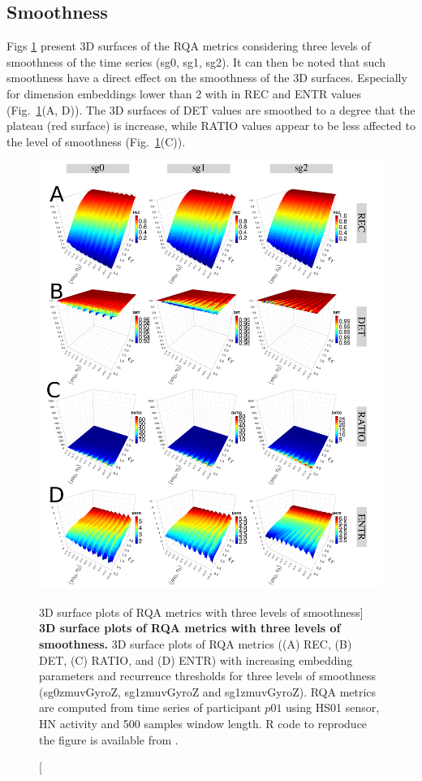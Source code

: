\subsection{Smoothness}
Figs \ref{fig:topo_smoothness} present 3D surfaces of the RQA metrics
considering three levels of smoothness of the time series (sg0, sg1, sg2).
It can then be noted that such smoothness have a direct effect on the 
smoothness of the 3D surfaces.
Especially for dimension embeddings lower than 2 with in REC and ENTR values 
(Fig.~\ref{fig:topo_smoothness}(A, D)).
The 3D surfaces of DET values are smoothed to a degree that the plateau 
(red surface) is increase, while RATIO values appear to be less 
affected to the level of smoothness (Fig.~\ref{fig:topo_smoothness}(C)).
\begin{figure}
\centering
\includegraphics[width=1.0\textwidth]{fig_6_13}
    \caption
	[3D surface plots of RQA metrics with three levels of smoothness]{
	{\bf 3D surface plots of RQA metrics with three levels of smoothness.}
	3D surface plots of RQA metrics ((A) REC, (B) DET, (C) RATIO, and (D) ENTR) 
	with increasing embedding parameters and recurrence thresholds for 
	three levels of smoothness 
	(sg0zmuvGyroZ, sg1zmuvGyroZ and sg1zmuvGyroZ).
	RQA metrics are computed from time series of participant $p01$ using 
	HS01 sensor, HN activity and 500 samples window length.
	R code to reproduce the figure is available from \cite{xochicale2018}.
 }
\label{fig:topo_smoothness}
\end{figure}

